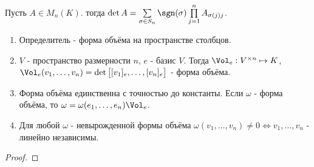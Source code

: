 \begin{definition} \thmslashn 

    Пусть $A\in M_{n}(K)$. тогда $\det A = \sum\limits_{\sigma\in S_{n}} \sgn(\sigma) \prod\limits_{j=1}^{n} A_{\sigma(j)j} $.
\end{definition}
\begin{theorem} \thmslashn

    \begin{enumerate}
        \item Определитель - форма объёма на пространстве столбцов.
        \item $V$ - пространство размерности $n$, $e$ - базис $V$. Тогда  $\Vol_{e} : V^{\times n} \mapsto K$, $\Vol_{e}(v_1, \ldots, v_{n}) = \det \begin{bmatrix} [v_1]_{e}, \ldots, [v_{n}]_{e} \end{bmatrix} $ - форма объёма.        \item Форма объёма единственна с точностью до константы. Если $\omega$ - форма объёма, то  $\omega = \omega(e_1, \ldots, e_{n})\Vol_{e}$.
        \item Для любой $\omega$  - невырожденной формы объёма $\omega(v_1, \ldots, v_{n}) \neq 0 \iff v_1, \ldots, v_{n}$ - линейно независимы.
    \end{enumerate}
    \begin{proof} \thmslashn
    
        \TODO{} 
    \end{proof}
\end{theorem}
